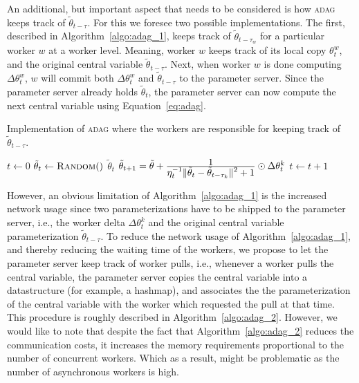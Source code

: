 An additional, but important aspect that needs to be considered is how \textsc{adag} keeps track of $\tilde{\theta}_{t - \tau}$. For this we foresee two possible implementations. The first, described in Algorithm~\ref{algo:adag_1}, keeps track of $\tilde{\theta}_{t - \tau_w}$ for a particular worker $w$ at a worker level. Meaning, worker $w$ keeps track of its local copy $\theta_t^w$, and the original central variable $\tilde{\theta}_{t-\tau}$. Next, when worker $w$ is done computing $\Delta\theta^w_t$, $w$ will commit both $\Delta\theta^w_t$ and $\tilde{\theta}_{t - \tau}$ to the parameter server. Since the parameter server already holds $\tilde{\theta}_{t}$, the parameter server can now compute the next central variable using Equation~\ref{eq:adag}.

\begin{algorithm}[H]
  \caption{Implementation of \textsc{adag} where the workers are responsible for keeping track of $\tilde{\theta}_{t - \tau}$.}
  \label{algo:adag_1}
  \begin{algorithmic}[1]
    \State $t \gets 0$ 
    \State $\tilde{\theta}_t \gets \Call{Random}$
    \State
     
    \State \Return $\tilde{\theta}_{t}$
    \EndProcedure
    \State
    \State $\tilde{\theta}_{t + 1} = \tilde{\theta} + \frac{\displaystyle 1}{\displaystyle \eta_t^{-1}\|\tilde{\theta}_t - \tilde{\theta}_{t - \tau_k}\|^2 + 1} \odot \Delta\theta^k_t$
    \State $t \gets t + 1$
    \EndProcedure
    \State
    \EndProcedure
  \end{algorithmic}
\end{algorithm}

However, an obvious limitation of Algorithm~\ref{algo:adag_1} is the increased network usage since two parameterizations have to be shipped to the parameter server, i.e., the worker delta $\Delta\theta^k_t$ and the original central variable parameterization $\tilde{\theta}_{t - \tau}$. To reduce the network usage of Algorithm~\ref{algo:adag_1}, and thereby reducing the waiting time of the workers, we propose to let the parameter server keep track of worker pulls, i.e., whenever a worker pulls the central variable, the parameter server copies the central variable into a datastructure (for example, a hashmap), and associates the the parameterization of the central variable with the worker which requested the pull at that time. This procedure is roughly described in Algorithm~\ref{algo:adag_2}. However, we would like to note that despite the fact that Algorithm~\ref{algo:adag_2} reduces the communication costs, it increases the memory requirements proportional to the number of concurrent workers. Which as a result, might be problematic as the number of asynchronous workers is high.

